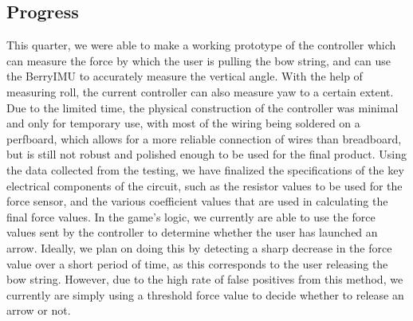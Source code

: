 \documentclass[titlepage, 12pt]{scrartcl}
\begin{document}
    \subsection{Progress}
        This quarter, we were able to make a working prototype of the controller which can measure the force by which the user is pulling the bow string, and can use the BerryIMU to accurately measure the vertical angle. With the help of measuring roll, the current controller can also measure yaw to a certain extent. Due to the limited time, the physical construction of the controller was minimal and only for temporary use, with most of the wiring being soldered on a perfboard, which allows for a more reliable connection of wires than breadboard, but is still not robust and polished enough to be used for the final product. Using the data collected from the testing, we have finalized the specifications of the key electrical components of the circuit, such as the resistor values to be used for the force sensor, and the various coefficient values that are used in calculating the final force values. In the game's logic, we currently are able to use the force values sent by the controller to determine whether the user has launched an arrow. Ideally, we plan on doing this by detecting a sharp decrease in the force value over a short period of time, as this corresponds to the user releasing the bow string. However, due to the high rate of false positives from this method, we currently are simply using a threshold force value to decide whether to release an arrow or not. \par
\end{document}
